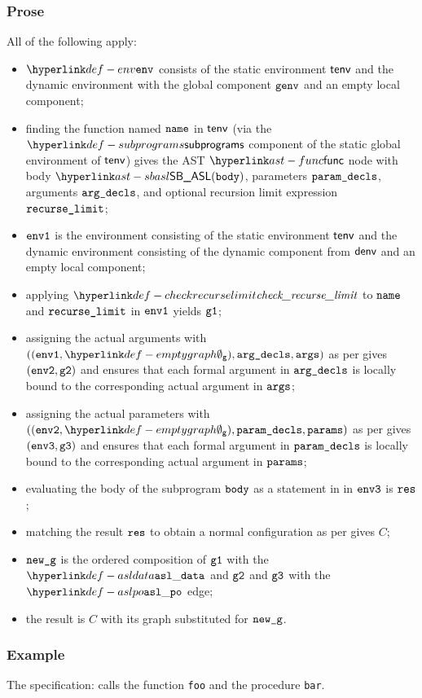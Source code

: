 \subsubsection{Prose}
All of the following apply:
\begin{itemize}
  \item $\env$ consists of the static environment $\textsf{tenv}$ and the dynamic environment with the global
        component $\texttt{genv}$ and an empty local component;
  \item finding the function named $\texttt{name}$ in $\textsf{tenv}$ (via the $\subprograms$ component of the static global environment of $\textsf{tenv}$)
        gives the AST $\func$ node with body
        $\SBASL(\vbody)$, parameters $\texttt{param\_decls}$, arguments $\texttt{arg\_decls}$, and optional recursion limit expression $\texttt{recurse\_limit}$;
  \item $\texttt{env1}$ is the environment consisting of the static environment $\textsf{tenv}$ and the dynamic
        environment consisting of the dynamic component from $\textsf{denv}$ and an empty local component;
  \item applying $\checkrecurselimit$ to $\texttt{name}$ and $\texttt{recurse\_limit}$ in $\texttt{env1}$ yields $\texttt{g1}$\ProseOrError;
  \item assigning the actual arguments with $((\envone, \emptygraph), \argdecls, \args)$
        as per  gives $(\texttt{env2}, \texttt{g2})$ and ensures that each
        formal argument in $\texttt{arg\_decls}$ is
        locally bound to the corresponding actual argument in $\texttt{args}$;
  \item assigning the actual parameters with $((\envtwo, \emptygraph), \paramdecls, \params)$
        as per  gives $(\texttt{env3}, \texttt{g3})$ and ensures that each
        formal argument in $\texttt{param\_decls}$ is
        locally bound to the corresponding actual argument in $\texttt{params}$;
  \item evaluating the body of the subprogram $\texttt{body}$ as a statement in in $\texttt{env3}$
        is $\texttt{res}$\ProseOrAbnormal;
  \item matching the result $\texttt{res}$ to obtain a normal configuration as per 
        gives $C$;
  \item $\texttt{new\_g}$ is the ordered composition of $\texttt{g1}$ with the $\asldata$ and $\texttt{g2}$ and $\texttt{g3}$ with the $\aslpo$ edge;
  \item the result is $C$ with its graph substituted for $\texttt{new\_g}$.
\end{itemize}

\subsubsection{Example}
The specification:
calls the function \texttt{foo} and the procedure \texttt{bar}.

